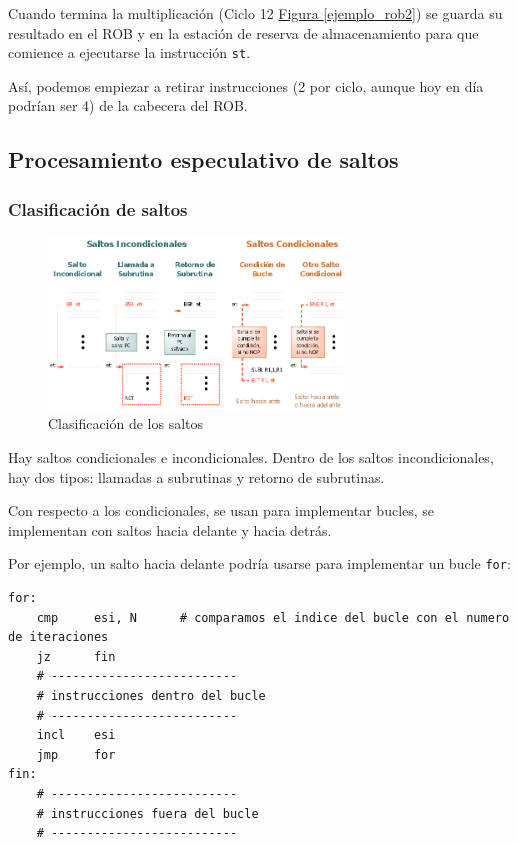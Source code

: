 \documentclass[10pt,a4paper,spanish]{report}
\begin{document}
Cuando termina la multiplicación (Ciclo 12 \hyperref[ejemplo_rob2]{Figura \ref*{ejemplo_rob2}}) se guarda su resultado en el ROB y en la estación de reserva de almacenamiento para que comience a ejecutarse la instrucción \verb*|st|.

Así, podemos empiezar a retirar instrucciones (2 por ciclo, aunque hoy en día podrían ser 4) de la cabecera del ROB.

\textcolor{azul}{\subsection{Procesamiento especulativo de saltos}}
\textcolor{azul}{\subsubsection{Clasificación de saltos}}
\begin{figure}[!h]
\centering
\includegraphics[width=0.7\textwidth]{104}
\caption{Clasificación de los saltos}
\label{saltos}
\end{figure}

Hay saltos condicionales e incondicionales. Dentro de los saltos incondicionales, hay dos tipos: llamadas a subrutinas y retorno de subrutinas.

Con respecto a los condicionales, se usan para implementar bucles, se implementan con saltos hacia delante y hacia detrás.

Por ejemplo, un salto hacia delante podría usarse para implementar un bucle \verb*|for|:

\begin{verbatim}
for:
    cmp     esi, N      # comparamos el indice del bucle con el numero de iteraciones
    jz      fin
    # --------------------------
    # instrucciones dentro del bucle
    # --------------------------
    incl    esi
    jmp     for
fin:
    # --------------------------
    # instrucciones fuera del bucle
    # --------------------------
\end{verbatim}
\end{document}
